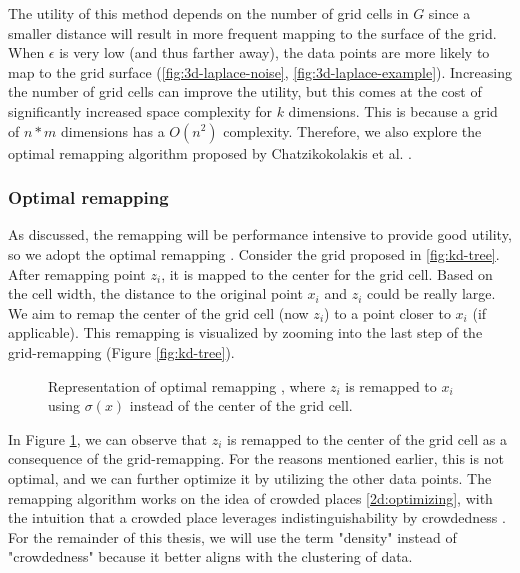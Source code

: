 The utility of this method depends on the number of grid cells in $G$ since a smaller distance will result in more frequent mapping to the surface of the grid.
When $\epsilon$ is very low (and thus farther away), the data points are more likely to map to the grid surface (\ref{fig:3d-laplace-noise}, \ref{fig:3d-laplace-example}).
Increasing the number of grid cells can improve the utility, but this comes at the cost of significantly increased space complexity for $k$ dimensions.
This is because a grid of $n*m$ dimensions has a $O(n^2)$ complexity.
Therefore, we also explore the optimal remapping algorithm proposed by Chatzikokolakis et al. \citep{chatzikokolakis_efficient_2017}.


\newpage
\subsubsection{Optimal remapping} \label{theory:optimal-remapping}
As discussed, the remapping will be performance intensive to provide good utility, so we adopt the optimal remapping \citep{chatzikokolakis_efficient_2017}.
Consider the grid proposed in \ref{fig:kd-tree}.
After remapping point $z_i$, it is mapped to the center for the grid cell.
Based on the cell width, the distance to the original point $x_i$ and $ z_i$ could be really large.
We aim to remap the center of the grid cell (now $z_i$) to a point closer to $x_i$ (if applicable). \newline
This remapping is visualized by zooming into the last step of the grid-remapping (Figure \ref{fig:kd-tree}).
\begin{figure}[H]
  
  \caption{Representation of optimal remapping \citep{chatzikokolakis_efficient_2017}, where $z_i$ is remapped to $x_i$ using $\sigma(x)$ instead of the center of the grid cell.}
  \label{fig:optimal-remapping}
\end{figure}
In Figure \ref{fig:optimal-remapping}, we can observe that $z_i$ is remapped to the center of the grid cell as a consequence of the grid-remapping.
For the reasons mentioned earlier, this is not optimal, and we can further optimize it by utilizing the other data points.
The remapping algorithm works on the idea of crowded places \ref{2d:optimizing}, with the intuition that a crowded place leverages indistinguishability by crowdedness \citep{chatzikokolakis_efficient_2017}.
For the remainder of this thesis, we will use the term "density" instead of "crowdedness" because it better aligns with the clustering of data.

